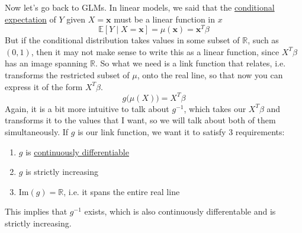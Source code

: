   Now let's go back to GLMs. In linear models, we said that the \hyperref[prob-def:cond-exp]{conditional expectation} of $Y$ given $X = \mathbf{x}$ must be a linear function in $x$ 
  \begin{equation}
    \mathbb{E}[Y \mid X = \mathbf{x}] = \mu(\mathbf{x}) = \mathbf{x}^T \beta
  \end{equation}
  But if the conditional distribution takes values in some subset of $\mathbb{R}$, such as $(0, 1)$, then it may not make sense to write this as a linear function, since $X^T \beta$ has an image spanning $\mathbb{R}$. So what we need is a link function that relates, i.e. transforms the restricted subset of $\mu$, onto the real line, so that now you can express it of the form $X^T \beta$. 
  \begin{equation}
    g \big( \mu(X) \big) = X^T \beta
  \end{equation}
  Again, it is a bit more intuitive to talk about $g^{-1}$, which takes our $X^T \beta$ and transforms it to the values that I want, so we will talk about both of them simultaneously. If $g$ is our link function, we want it to satisfy 3 requirements: 
  \begin{enumerate}
      \item $g$ is \hyperref[mv-def:continuously-differentiable]{continuously differentiable} 
      \item $g$ is strictly increasing 
      \item $\mathrm{Im}(g) = \mathbb{R}$, i.e. it spans the entire real line
  \end{enumerate}
  This implies that $g^{-1}$ exists, which is also continuously differentable and is strictly increasing. 

